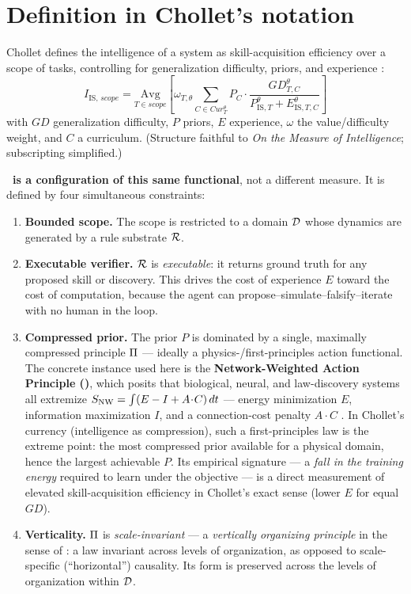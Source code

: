 \section{Definition in Chollet's notation}
\label{sec:definition}

Chollet defines the intelligence of a system as skill-acquisition efficiency over a scope of tasks, controlling for generalization difficulty, priors, and experience \citep{chollet2019}:
%
\begin{equation}
I_{\mathrm{IS},\,scope}
=\underset{T\in scope}{\mathrm{Avg}}
\!\left[
\omega_{T,\theta}\!
\sum_{C\in Cur^{\theta}_{T}}\!
P_{C}\cdot
\frac{GD^{\theta}_{T,C}}
{P^{\theta}_{\mathrm{IS},T}+E^{\theta}_{\mathrm{IS},T,C}}
\right]
\label{eq:chollet}
\end{equation}
%
with $GD$ generalization difficulty, $P$ priors, $E$ experience, $\omega$ the value/difficulty weight, and $C$ a curriculum. (Structure faithful to \emph{On the Measure of Intelligence}; subscripting simplified.)

\textbf{\DCI\ is a configuration of this same functional}, not a different measure. It is defined by four simultaneous constraints:

\begin{enumerate}
\item \textbf{Bounded scope.} The scope is restricted to a domain $\mathcal{D}$ whose dynamics are generated by a rule substrate $\mathcal{R}$.
\item \textbf{Executable verifier.} $\mathcal{R}$ is \emph{executable}: it returns ground truth for any proposed skill or discovery. This drives the cost of experience $E$ toward the cost of computation, because the agent can propose--simulate--falsify--iterate with no human in the loop.
\item \textbf{Compressed prior.} The prior $P$ is dominated by a single, maximally compressed principle $\Pi$ --- ideally a physics-/first-principles action functional. The concrete instance used here is the \textbf{Network-Weighted Action Principle (\NWAP)}, which posits that biological, neural, and law-discovery systems all extremize $S_{\mathrm{NW}} = \int (E - I + A\!\cdot\!C)\,dt$ --- energy minimization $E$, information maximization $I$, and a connection-cost penalty $A\!\cdot\!C$ \citep{frasch2026a,frasch2026b,frasch2026c}. In Chollet's currency (intelligence as compression), such a first-principles law is the extreme point: the most compressed prior available for a physical domain, hence the largest achievable $P$. Its empirical signature --- a \emph{fall in the training energy} required to learn under the objective --- is a direct measurement of elevated skill-acquisition efficiency in Chollet's exact sense (lower $E$ for equal $GD$).
\item \textbf{Verticality.} $\Pi$ is \emph{scale-invariant} --- a \emph{vertically organizing principle} in the sense of \citet{frasch2026a}: a law invariant across levels of organization, as opposed to scale-specific (``horizontal'') causality. Its form is preserved across the levels of organization within $\mathcal{D}$.
\end{enumerate}

